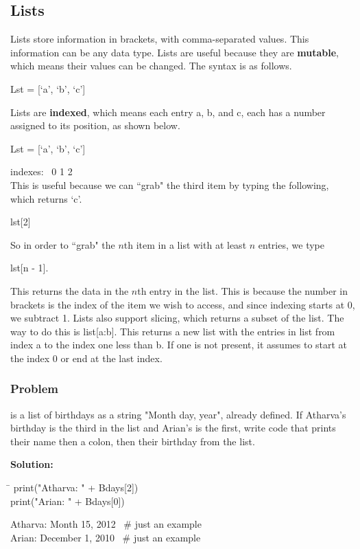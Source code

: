 \documentclass{article}
\newcommand{\define}[1]{\begin{center}\ttfamily #1\end{center}}
\newcommand{\icode}[1]{{\ttfamily #1}}
\begin{document}
\subsection{Lists}
Lists store information in brackets, with comma-separated values. This information can be any data type. Lists are useful because they are \textbf{mutable}, which means their values can be changed. The syntax is as follows.
\define{Lst = [`a', `b', `c']}
Lists are \textbf{indexed}, which means each entry a, b, and c, each has a number assigned to its position, as shown below.
\define{Lst = [`a', `b', `c']}
\hspace{6.32 cm}indexes: \ 0 \hspace{.5 cm} 1 \hspace{.5 cm} 2\\
This is useful because we can ``grab" the third item by typing the following, which returns {\ttfamily `c'}.
\define{lst[2]}
So in order to ``grab" the $n$th item in a list with at least $n$ entries, we type
\define{lst[n - 1].}
This returns the data in the $n$th entry in the list. This is because the number in brackets is the index of the item we wish to access, and since indexing starts at 0, we subtract 1. Lists also support slicing, which returns a subset of the list. The way to do this is \icode{list[a:b]}. This returns a new list with the entries in \icode{list} from index \icode{a} to the index one less than \icode{b}. If one is not present, it assumes to start at the index 0 or end at the last index. 

\subsubsection{Problem}
 is a list of birthdays as a string \icode{"Month day, year"}, already defined. If Atharva's birthday is the third in the list and Arian's is the first, write code that prints their name then a colon, then their birthday from the list.
\vspace{1 mm}

\noindent\textbf{Solution:}
\begin{tcolorbox}
	\ttfamily
	\begin{tabbing}
		\hspace{3.25 in}\=\hspace{3.25 in} \kill
		print("Atharva: " + Bdays[2])\\
		print("Arian: " + Bdays[0])
	\end{tabbing}
\end{tcolorbox}
\begin{tcolorbox}[colback=output]
	\ttfamily Atharva: Month 15, 2012 \ \# just an example\\
	Arian: December 1, 2010 \ \# just an example
\end{tcolorbox}
\vspace{.5 cm}
\end{document}
